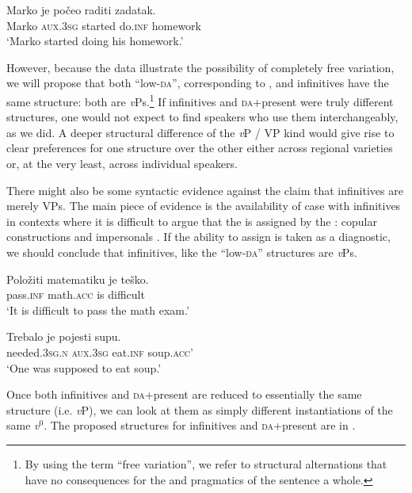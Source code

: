 \documentclass[output=paper,modfonts,newtxmath,hidelinks,]{langscibook}
\begin{document}
\ea \label{7:ex11}
\gll Marko je počeo raditi zadatak.\\
     Marko \textsc{aux.3sg} started do.\textsc{inf} homework\\
\glt `Marko started doing his homework.'
\z

\noindent However, because the data illustrate the possibility of completely free variation, we will propose that both ``low-\textsc{da}'', corresponding to , and infinitives have the same structure: both are \textit{v}Ps.\footnote{\label{7:fn4}By using the term ``free variation'', we refer to structural alternations that have no consequences for the  and pragmatics of the sentence a whole.}  If infinitives and \textsc{da}+present were truly different structures, one would not expect to find speakers who use them interchangeably, as we did. A deeper structural difference of the \textit{v}P / VP kind would give rise to clear preferences for one structure over the other either across regional varieties or, at the very least, across individual speakers.



There might also  be some syntactic evidence against the claim that infinitives are merely VPs. The main piece of evidence is the availability of  case with infinitives in contexts where it is difficult to argue that the  is assigned by the : copular constructions  and impersonals . If the ability to assign  is taken as a diagnostic, we should conclude that infinitives, like the ``low-\textsc{da}'' structures are \textit{v}Ps.

\ea \label{7:ex12}
\gll Položiti matematiku je teško.\\
     pass.\textsc{inf} math.\textsc{acc} is difficult\\
\glt `It is difficult to pass the math exam.'
\z

\ea \label{7:ex13}
\gll Trebalo je pojesti supu.\\
     needed.\textsc{3sg.n} \textsc{aux.3sg} eat.\textsc{inf} soup.\textsc{acc}'\\
\glt `One was supposed to eat soup.'
\z

\noindent Once both infinitives and \textsc{da}+present are reduced to essentially the same structure (i.e. \textit{v}P), we can look at them as simply different instantiations of the same \textit{v$^0$}. The proposed structures for infinitives and \textsc{da}+present are in .\largerpage[-1]
\end{document}
